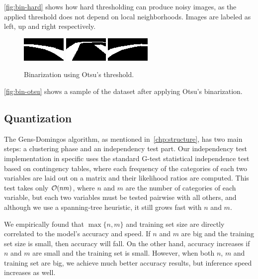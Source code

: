 \autoref{fig:bin-hard} shows how hard thresholding can produce noisy images, as the applied
threshold does not depend on local neighborhoods. Images are labeled as left, up and right
respectively.

\begin{figure}[h]
  \centering
  \includegraphics[scale=1.75]{imgs/binary_left.png}
  \includegraphics[scale=1.75]{imgs/binary_up.png}
  \includegraphics[scale=1.75]{imgs/binary_right.png}
  \caption{Binarization using Otsu's threshold.\label{fig:bin-otsu}}
\end{figure}

\autoref{fig:bin-otsu} shows a sample of the dataset after applying Otsu's binarization.

\subsection{Quantization}

The Gens-Domingos algorithm, as mentioned in~\autoref{chp:structure}, has two main steps: a
clustering phase and an independency test part. Our independency test implementation in specific
uses the standard G-test statistical independence test based on contingency tables, where each
frequency of the categories of each two variables are laid out on a matrix and their likelihood
ratios are computed. This test takes only $\mathcal{O}(n m)$, where $n$ and $m$ are the number of
categories of each variable, but each two variables must be tested pairwise with all others, and
although we use a spanning-tree heuristic, it still grows fast with $n$ and $m$.

We empirically found that $\max\{n,m\}$ and training set size are directly correlated to the
model's accuracy and speed. If $n$ and $m$ are big and the training set size is small, then
accuracy will fall. On the other hand, accuracy increases if $n$ and $m$ are small and the training
set is small. However, when both $n$, $m$ and training set are big, we achieve much better accuracy
results, but inference speed increases as well.


